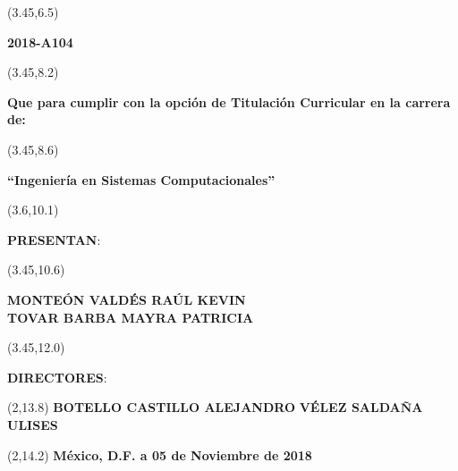 	\begin{textblock}{12}(3.45,6.5)
		\begin{center} \Large{\textbf{2018-A104}} \end{center}
	\end{textblock}
	
	\begin{textblock}{12}(3.45,8.2)
		\begin{center} \normalsize{\bf{Que para cumplir con la opción de Titulación Curricular en la carrera de:}} \end{center}
	\end{textblock}
	
	\begin{textblock}{12}(3.45,8.6)
		\begin{center} \large{\textbf{“Ingeniería en Sistemas Computacionales”}}\end{center}
	\end{textblock}
	
	\begin{textblock}{12}(3.6,10.1)
		\begin{center} \textbf{PRESENTAN}: \end{center}
	\end{textblock}
	
	\begin{textblock}{12}(3.45,10.6)
		\begin{center} \Large{\textbf{MONTEÓN VALDÉS RAÚL KEVIN \\ TOVAR BARBA MAYRA PATRICIA}} \end{center}
	\end{textblock}
	
	\begin{textblock}{12}(3.45,12.0)
		\begin{center} \textbf{DIRECTORES}: \end{center}
	\end{textblock}
	
	\begin{textblock}{30}(2,13.8)
		 \textbf{BOTELLO CASTILLO ALEJANDRO }\hspace{1in} \textbf{VÉLEZ SALDAÑA ULISES }
	\end{textblock}
	\begin{textblock}{12}(2,14.2)
		\raggedleft	\textbf{México, D.F. a 05 de Noviembre de 2018}
	\end{textblock}
	\newpage 